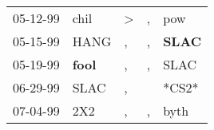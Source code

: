 \begin{supertabular}{p{0.07\textwidth}p{0.06\textwidth}p{0.02\textwidth}p{0.02\textwidth}p{0.06\textwidth}}
 05-12-99\textsuperscript{} &           chil\textsuperscript{} &  \textgreater &  , &            pow\textsuperscript{} \\
 05-15-99\textsuperscript{} &           HANG\textsuperscript{} &             , &  , &  \textbf{SLAC\textsuperscript{}} \\
 05-19-99\textsuperscript{} &  \textbf{fool\textsuperscript{}} &             , &  , &           SLAC\textsuperscript{} \\
 06-29-99\textsuperscript{} &           SLAC\textsuperscript{} &             , &    &                            *CS2* \\
 07-04-99\textsuperscript{} &            2X2\textsuperscript{} &             , &  , &           byth\textsuperscript{} \\
\end{supertabular}
